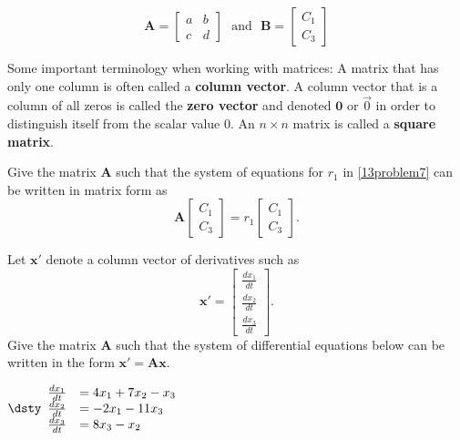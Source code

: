 \ii 
\[ \mathbf{A} =  \left[ \begin{array}{cc} a & b  \\ c & d \end{array} \right] \ \ \ \mbox{and} \ \ \ 
 \mathbf{B} = \left[ \begin{array}{c} C_1 \\ C_3   \end{array} \right] \]
\vfill
\ee
\ee

Some important terminology when working with matrices:
\bi
\ii A matrix that has only one column is often called a \textbf{column vector}.
\ii A column vector that is a column of all zeros is called the \textbf{zero vector} and denoted $\mathbf{0}$ or $\vec{0}$ in order to distinguish itself from the scalar value 0.
\ii An $n \times n$ matrix is called a \textbf{square matrix}.
\ei

\bb[resume]
\ii Give the matrix $\mathbf{A}$ such that the system of equations for $r_1$ in \ref{13problem7} can be written in matrix form as \label{13problem9}
\[ \mathbf{A}  \left[ \begin{array}{c} C_1 \\ C_3   \end{array} \right] = r_1  \left[ \begin{array}{c} C_1 \\ C_3   \end{array} \right].\]
\vfill

\clearpage

\ii Let $\mathbf{x'}$ denote a column vector of derivatives such as
\[ \mathbf{x'} =  \left[ \begin{array}{c} \frac{dx_1}{dt} \\ \frac{dx_2}{dt} \\ \frac{dx_3}{dt}  \end{array} \right] . \]
Give the matrix $\mathbf{A}$ such that the system of differential equations below can be written in the form $\mathbf{x'} = \mathbf{A} \mathbf{x}$.\label{13problem10}

\ms

$\dsty \begin{array}{rl}
\frac{dx_1}{dt} &= 4 x_1 + 7 x_2 - x_3 \\
\frac{dx_2}{dt} &= -2x_1-11x_3\\
\frac{dx_3}{dt} &= 8x_3-x_2
\end{array}$ \vfill



